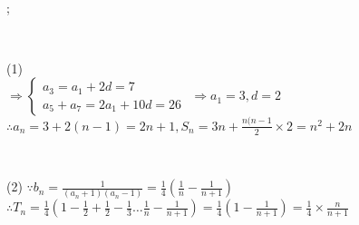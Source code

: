 
\immediate{}
\immediate{}
%
\begin{minipage}[b][14cm][t]{\textwidth}
\begin{center}\large{}\end{center}
\color{black}\begin{large}
\\
;\\
\end{large}\\[10pt]
\begin{large}(1)
\\
$\Longrightarrow \begin{cases}
  a_3=a_1+2d=7 \\
  a_5+a_7=2a_1+10d=26
\end{cases}$ $\Rightarrow a_1=3,d=2$\\
$\therefore a_n=3+2(n-1)=2n+1,S_n=3n+\frac{n(n-1}{2} \times 2=n^2+2n$
\end{large}\\[10pt]
\begin{large}(2)
  $\because b_n=\frac{1}{(a_n+1)(a_n-1)}=\frac{1}{4}(\frac{1}{n}-\frac{1}{n+1})$\\
  $\therefore T_n=\frac{1}{4}(1-\frac{1}{2}+\frac{1}{2}-\frac{1}{3} \dots \frac{1}{n}-\frac{1}{n+1})=\frac{1}{4}(1-\frac{1}{n+1})=\frac{1}{4} \times \frac{n}{n+1}$
\end{large}
\end{minipage}
